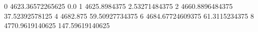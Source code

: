 0 4623.36572265625 0.0
1 4625.8984375 2.53271484375
2 4660.8896484375 37.52392578125
4 4682.875 59.50927734375
6 4684.67724609375 61.3115234375
8 4770.9619140625 147.59619140625
